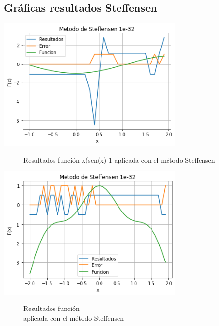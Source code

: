 \documentclass[]{hdsr}
\begin{document}
    \subsection{Gráficas resultados Steffensen}
    \begin{center}
        \includegraphics[width=0.7\textwidth]{figs/sen(-32).png} 
        \begin{figure}[H]
            \centering
            \caption{}
            \label{fig:my_label}
            Resultados función x(sen(x)-1 aplicada con el método Steffensen\\
        \end{figure}
    \end{center}
    
    \begin{center}
        \includegraphics[width=0.7\textwidth]{figs/cos(-32).png} 
        \begin{figure}[H]
            \centering
            \caption{}
            \label{fig:my_label}
            Resultados función  \\\hspace{0.2cm} aplicada con el método Steffensen\\
        \end{figure}
    \end{center}
    
\end{document}
